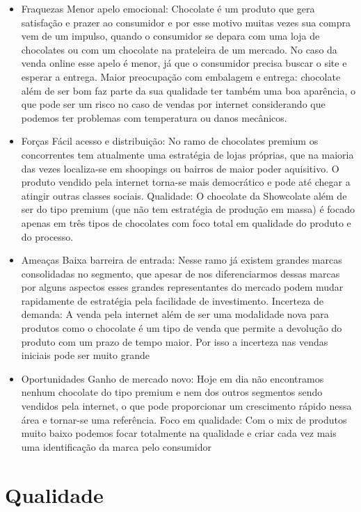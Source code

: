 \documentclass[
	12pt,				%
	openright,			%
	oneside,			%
	a4paper,			%
	english,			%
	french,				%
	spanish,			%
	brazil				%
	]{abntex2}
\begin{document}
\begin{itemize}
\item Fraquezas
\subitem Menor apelo emocional: Chocolate é um produto que gera satisfação e prazer ao consumidor e por esse motivo muitas vezes sua compra vem de um impulso, quando o consumidor se depara com uma loja de chocolates ou com um chocolate na prateleira de um mercado. No caso da venda online esse apelo é menor, já que o consumidor precisa buscar o site e esperar a entrega.
\subitem Maior preocupação com embalagem e entrega: chocolate além de ser bom faz parte da sua qualidade ter também uma boa aparência, o que pode ser um risco no caso de vendas por internet considerando que podemos ter problemas com temperatura ou danos mecânicos.
\item Forças
\subitem Fácil acesso e distribuição: No ramo de chocolates premium os concorrentes tem atualmente uma estratégia de lojas próprias, que na maioria das vezes localiza-se em shoopings ou bairros de maior poder aquisitivo. O produto vendido pela internet torna-se mais democrático e pode até chegar a atingir outras classes sociais.
\subitem Qualidade: O chocolate da Showcolate além de ser do tipo premium (que não tem estratégia de produção em massa) é focado apenas em três tipos de chocolates com foco total em qualidade do produto e do processo.
\item Ameaças
\subitem Baixa barreira de entrada: Nesse ramo já existem grandes marcas consolidadas no segmento, que apesar de nos diferenciarmos dessas marcas por alguns aspectos esses grandes representantes do mercado podem mudar rapidamente de estratégia pela facilidade de investimento.
\subitem Incerteza de demanda:  A venda pela internet além de ser uma modalidade nova para produtos como o chocolate é um tipo de venda que permite a devolução do produto com um prazo de tempo maior. Por isso a incerteza nas vendas iniciais pode ser muito grande
\item Oportunidades
\subitem Ganho de mercado novo: Hoje em dia não encontramos nenhum chocolate do tipo premium e nem dos outros segmentos sendo vendidos pela internet, o que pode proporcionar um crescimento rápido nessa área e tornar-se uma referência.
\subitem Foco em qualidade: Com o mix de produtos muito baixo podemos focar totalmente na qualidade e criar cada vez mais uma identificação da marca pelo consumidor 
\end{itemize}


\newpage
\chapter{Qualidade}
\end{document}
